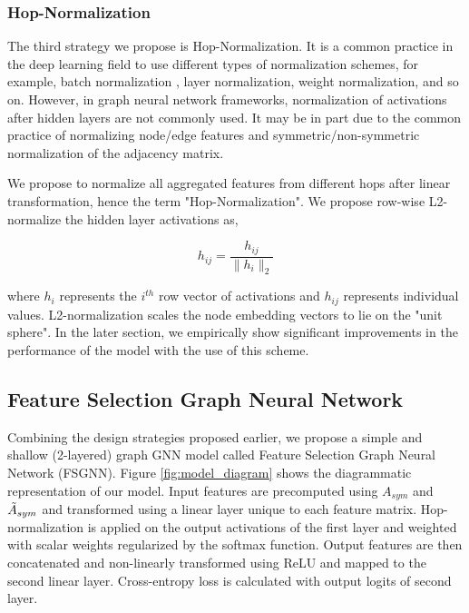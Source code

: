 \documentclass[sigconf,natbib=false]{acmart}
\begin{document}
\subsubsection{Hop-Normalization}\hfill

The third strategy we propose is Hop-Normalization. It is a common practice in the deep learning field to use different types of normalization schemes, for example, batch normalization \cite{ioffe_batch_2015}, layer normalization, weight normalization, and so on. However, in graph neural network frameworks, normalization of activations after hidden layers are not commonly used. It may be in part due to the common practice of normalizing node/edge features and symmetric/non-symmetric normalization of the adjacency matrix.

We propose to normalize all aggregated features from different hops after linear transformation, hence the term "Hop-Normalization". We propose row-wise L2-normalize the hidden layer activations as,

\begin{equation}
    h_{ij} = \frac{h_{ij}}{\parallel h_{i} \parallel_2}
\end{equation}

 where $h_{i}$ represents the $i^{th}$ row vector of activations and $h_{ij}$ represents individual values. L2-normalization scales the node embedding vectors to lie on the "unit sphere". In the later section, we empirically show significant improvements in the performance of the model with the use of this scheme.




\subsection{Feature Selection Graph Neural Network}

Combining the design strategies proposed earlier, we propose a simple and shallow (2-layered) graph GNN model called Feature Selection Graph Neural Network (FSGNN). Figure \ref{fig:model_diagram} shows the diagrammatic representation of our model. Input features are precomputed using $A_{sym}$ and $\Tilde{A}_{sym}$ and transformed using a linear layer unique to each feature matrix. Hop-normalization is applied on the output activations of the first layer and weighted with scalar weights regularized by the softmax function. Output features are then concatenated and non-linearly transformed using ReLU and mapped to the second linear layer. Cross-entropy loss is calculated with output logits of second layer.
\end{document}

